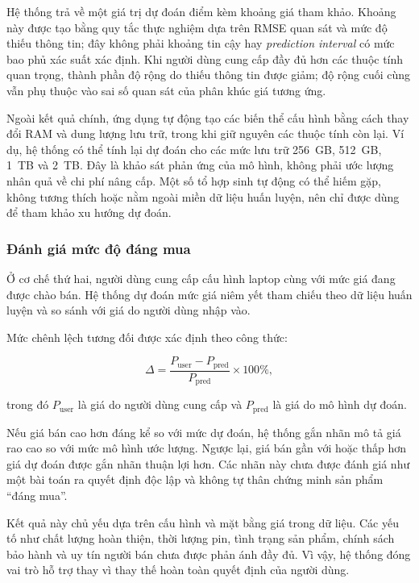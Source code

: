 Hệ thống trả về một giá trị dự đoán điểm kèm khoảng giá tham khảo. Khoảng này được tạo bằng quy tắc thực nghiệm dựa trên RMSE quan sát và mức độ thiếu thông tin; đây không phải khoảng tin cậy hay \textit{prediction interval} có mức bao phủ xác suất xác định. Khi người dùng cung cấp đầy đủ hơn các thuộc tính quan trọng, thành phần độ rộng do thiếu thông tin được giảm; độ rộng cuối cùng vẫn phụ thuộc vào sai số quan sát của phân khúc giá tương ứng.

Ngoài kết quả chính, ứng dụng tự động tạo các biến thể cấu hình bằng cách thay đổi RAM và dung lượng lưu trữ, trong khi giữ nguyên các thuộc tính còn lại. Ví dụ, hệ thống có thể tính lại dự đoán cho các mức lưu trữ 256~GB, 512~GB, 1~TB và 2~TB. Đây là khảo sát phản ứng của mô hình, không phải ước lượng nhân quả về chi phí nâng cấp. Một số tổ hợp sinh tự động có thể hiếm gặp, không tương thích hoặc nằm ngoài miền dữ liệu huấn luyện, nên chỉ được dùng để tham khảo xu hướng dự đoán.

\subsubsection{Đánh giá mức độ đáng mua}

Ở cơ chế thứ hai, người dùng cung cấp cấu hình laptop cùng với mức giá đang được chào bán. Hệ thống dự đoán mức giá niêm yết tham chiếu theo dữ liệu huấn luyện và so sánh với giá do người dùng nhập vào.

Mức chênh lệch tương đối được xác định theo công thức:

\begin{equation}
    \Delta =
    \frac{P_{\text{user}} - P_{\text{pred}}}
    {P_{\text{pred}}}
    \times 100\%,
\end{equation}

trong đó $P_{\text{user}}$ là giá do người dùng cung cấp và
$P_{\text{pred}}$ là giá do mô hình dự đoán.

Nếu giá bán cao hơn đáng kể so với mức dự đoán, hệ thống gắn nhãn mô tả giá rao cao so với mức mô hình ước lượng. Ngược lại, giá bán gần với hoặc thấp hơn giá dự đoán được gắn nhãn thuận lợi hơn. Các nhãn này chưa được đánh giá như một bài toán ra quyết định độc lập và không tự thân chứng minh sản phẩm ``đáng mua''.

Kết quả này chủ yếu dựa trên cấu hình và mặt bằng giá trong dữ liệu. Các yếu tố như chất lượng hoàn thiện, thời lượng pin, tình trạng sản phẩm, chính sách bảo hành và uy tín người bán chưa được phản ánh đầy đủ. Vì vậy, hệ thống đóng vai trò hỗ trợ thay vì thay thế hoàn toàn quyết định của người dùng.

